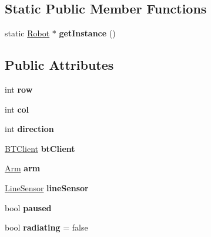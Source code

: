\subsection*{Static Public Member Functions}
\begin{DoxyCompactItemize}
\item 
\hypertarget{classRobot_ac6f19dc31b435f8a2d43944ba49286d0}{static \hyperlink{classRobot}{Robot} $\ast$ {\bfseries get\-Instance} ()}\label{classRobot_ac6f19dc31b435f8a2d43944ba49286d0}

\end{DoxyCompactItemize}
\subsection*{Public Attributes}
\begin{DoxyCompactItemize}
\item 
\hypertarget{classRobot_a35ce5c416a079fcf6b943843ec151d63}{int {\bfseries row}}\label{classRobot_a35ce5c416a079fcf6b943843ec151d63}

\item 
\hypertarget{classRobot_a2e08d53491bb82defe2e28ee9ce1d096}{int {\bfseries col}}\label{classRobot_a2e08d53491bb82defe2e28ee9ce1d096}

\item 
\hypertarget{classRobot_ac25b4dfc2e9e5aa86ec5684d075d32b8}{int {\bfseries direction}}\label{classRobot_ac25b4dfc2e9e5aa86ec5684d075d32b8}

\item 
\hypertarget{classRobot_a9da91e6d551ed02038e935b3c755cc75}{\hyperlink{classBTClient}{B\-T\-Client} {\bfseries bt\-Client}}\label{classRobot_a9da91e6d551ed02038e935b3c755cc75}

\item 
\hypertarget{classRobot_a444673862cbe384992aceb066282b500}{\hyperlink{classArm}{Arm} {\bfseries arm}}\label{classRobot_a444673862cbe384992aceb066282b500}

\item 
\hypertarget{classRobot_abdc300045bea9a31013b25682629752d}{\hyperlink{classLineSensor}{Line\-Sensor} {\bfseries line\-Sensor}}\label{classRobot_abdc300045bea9a31013b25682629752d}

\item 
\hypertarget{classRobot_a6a1fae6e6ee0a3298b9e60d3f50ad12a}{bool {\bfseries paused}}\label{classRobot_a6a1fae6e6ee0a3298b9e60d3f50ad12a}

\item 
\hypertarget{classRobot_a77f62d85ab1cf34e79c2a3acd470a4ce}{bool {\bfseries radiating} = false}\label{classRobot_a77f62d85ab1cf34e79c2a3acd470a4ce}

\end{DoxyCompactItemize}
